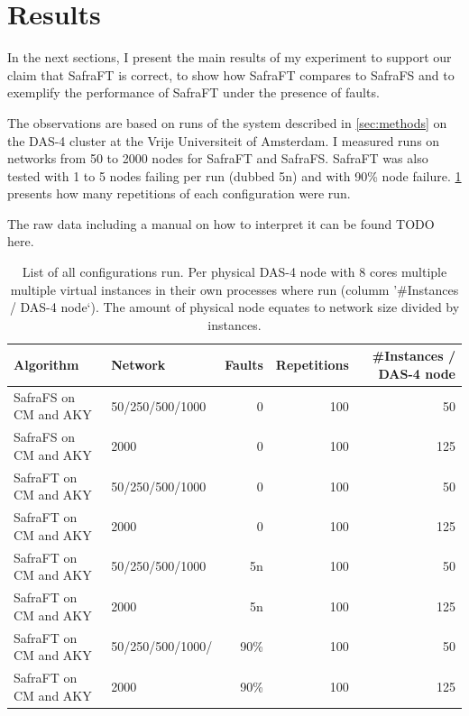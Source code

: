 \section{Results}
\label{sec:results}
In the next sections, I present the main results of my experiment to support our claim that SafraFT is correct, to show how SafraFT compares to SafraFS and to exemplify the performance of SafraFT under the presence of faults.

The observations are based on runs of the system described in \cref{sec:methods} on the DAS-4 cluster at the Vrije Universiteit of Amsterdam.
I measured runs on networks from 50 to 2000 nodes for SafraFT and SafraFS.
SafraFT was also tested with 1 to 5 nodes failing per run (dubbed 5n) and with 90\% node failure.
\cref{table:runs} presents how many repetitions of each configuration were run.

The raw data including a manual on how to interpret it can be found TODO here.
\begin{table}[]
	\centering
	\begin{tabular}{@{}llrrr@{}}
		\toprule
		Algorithm & Network              & Faults & Repetitions  & \#Instances / DAS-4 node   \\ \midrule
		SafraFS on CM and AKY  & 50/250/500/1000      & 0      & 100          & 50                    \\
		SafraFS on CM and AKY  & 2000                 & 0      & 100          & 125                   \\
		SafraFT on CM and AKY  & 50/250/500/1000      & 0      & 100          & 50                    \\
		SafraFT on CM and AKY  & 2000                 & 0      & 100          & 125                   \\
		SafraFT on CM and AKY  & 50/250/500/1000      & 5n     & 100          & 50                    \\
		SafraFT on CM and AKY  &    2000              & 5n     & 100          & 125                   \\
		SafraFT on CM and AKY  & 50/250/500/1000/     & 90\%   & 100          & 50                    \\
		SafraFT on CM and AKY  &    2000              & 90\%   & 100          & 125                   \\ \bottomrule
	\end{tabular}
	\caption{List of all configurations run. Per physical DAS-4 node with 8 cores multiple multiple virtual instances in their own processes where run (columm '\#Instances / DAS-4 node`). The amount of physical node equates to network size divided by instances.}
	\label{table:runs}
\end{table}

